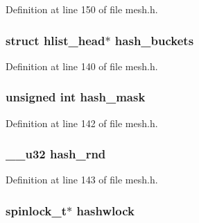 Definition at line 150 of file mesh.\-h.

\hypertarget{structmesh__table_a04eadd518c34fb4fff4aaed97e1234e0}{
\subsubsection[{hash\-\_\-buckets}]{\setlength{\rightskip}{0pt plus 5cm}struct hlist\-\_\-head$\ast$ hash\-\_\-buckets}}\label{structmesh__table_a04eadd518c34fb4fff4aaed97e1234e0}


Definition at line 140 of file mesh.\-h.

\hypertarget{structmesh__table_a379901d7620aa43cd8472e2c189af861}{
\subsubsection[{hash\-\_\-mask}]{\setlength{\rightskip}{0pt plus 5cm}unsigned int hash\-\_\-mask}}\label{structmesh__table_a379901d7620aa43cd8472e2c189af861}


Definition at line 142 of file mesh.\-h.

\hypertarget{structmesh__table_aefd9eaac521878de0638370ef2c70d71}{
\subsubsection[{hash\-\_\-rnd}]{\setlength{\rightskip}{0pt plus 5cm}\-\_\-\-\_\-u32 hash\-\_\-rnd}}\label{structmesh__table_aefd9eaac521878de0638370ef2c70d71}


Definition at line 143 of file mesh.\-h.

\hypertarget{structmesh__table_a26e336e1f797741f588ac094b1ac0202}{
\subsubsection[{hashwlock}]{\setlength{\rightskip}{0pt plus 5cm}spinlock\-\_\-t$\ast$ hashwlock}}\label{structmesh__table_a26e336e1f797741f588ac094b1ac0202}


